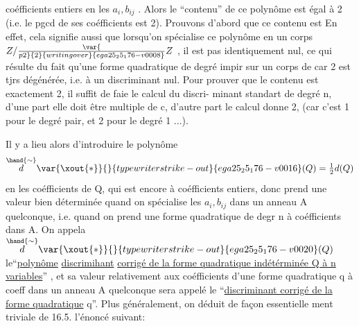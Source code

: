 
coéfficients entiers en les $a_i,b_{ij}$ . Alors le ``contenu'' de ce polynôme
est égal à 2 (i.e. le pgcd de ses coéfficients est 2).
 Prouvons d'abord que ce contenu est 
En effet, cela signifie aussi que  lorsqu'on spécialise ce polynôme
en un corps $Z/\var{\over{p}{2}}{2}{writing over}{ega25_25_176-v0008}Z$\hand{)} , il est pas identiquement nul, ce qui 
résulte du fait qu'une forme quadratique de degré impir sur un corps de
car 2 est tjrs dégénérée, i.e. à un discriminant nul. Pour prouver
que le contenu  est exactement 2, il suffit de faie le calcul du discri-%
minant  standart de degré n, d'une part elle doit être multiple de c,
d'autre part le calcul donne 2, (car c'est 1 pour le degré pair, et 2 pour
le degré 1 ...).

 Il y a lieu alors d'introduire le polynôme
\[ \overset{\hand{\sim}}{d}\var{\xout{*}}{}{typewriter strike-out}{ega25_25_176-v0016}(Q) = \tfrac{1}{2}d(Q) \]
en les coéfficients de Q, qui est encore à coéfficients entiers, donc
prend une valeur bien déterminée quand on spécialise les $a_i,b_{ij}$ dans un
anneau A quelconque, i.e. quand on prend une forme quadratique de degr
n à coéfficients dans A. On appela $\overset{\hand{\sim}}{d}\var{\xout{*}}{}{typewriter strike-out}{ega25_25_176-v0020}(Q)$ le``\uline{polynôme} \uline{discrimihant}
\uline{corrigé de la forme quadratique indétérminée Q à n variables}'' , et sa
valeur relativement aux coéfficients d'une forme quadratique q à coeff
dans un anneau A quelconque sera appelé le ``\uline{discriminant corrigé de la}
\uline{forme quadratique} q''. Plus généralement, on déduit de façon essentielle
ment triviale de 16.5. l'énoncé suivant:

